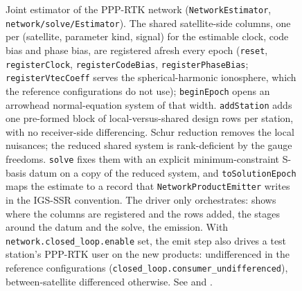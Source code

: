 \documentclass[main.tex]{subfiles}
\begin{document}
\begin{figure}[tbp]
{}
\caption{Joint estimator of the PPP-RTK network
(\texttt{NetworkEstimator}, \texttt{network/solve/Estimator}). The shared
satellite-side columns, one per (satellite, parameter kind, signal) for the
estimable clock, code bias and phase bias, are registered afresh every epoch
(\texttt{reset}, \texttt{registerClock}, \texttt{registerCodeBias},
\texttt{registerPhaseBias}; \texttt{registerVtecCoeff} serves the
spherical-harmonic ionosphere, which the reference configurations do not use);
\texttt{beginEpoch} opens an arrowhead normal-equation system of that width.
\texttt{addStation} adds one pre-formed block of local-versus-shared design
rows per station, with no receiver-side differencing. Schur reduction removes
the local nuisances; the reduced shared system is rank-deficient by the gauge
freedoms. \texttt{solve} fixes them with an explicit minimum-constraint S-basis
datum on a copy of the reduced system, and \texttt{toSolutionEpoch} maps the
estimate to a record that \texttt{NetworkProductEmitter} writes in the IGS-SSR
convention. The driver only orchestrates:  shows where
the columns are registered and the rows added,  the stages
around the datum and the solve,  the emission. With
\texttt{network.closed\_loop.enable} set, the emit step also drives a test
station's PPP-RTK user on the new products: undifferenced in the reference
configurations (\texttt{closed\_loop.consumer\_undifferenced}), between-satellite
differenced otherwise. See  and
.}
\label{fig:net-flow}
\end{figure}
\end{document}
